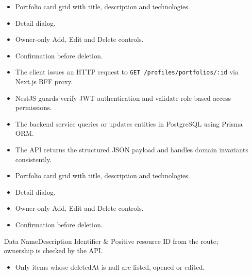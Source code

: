 \begin{itemize}[leftmargin=1.6em,topsep=3pt,itemsep=2pt,parsep=0pt,label=$\bullet$]
    \item Portfolio card grid with title, description and technologies.
    \item Detail dialog.
    \item Owner-only Add, Edit and Delete controls.
    \item Confirmation before deletion.
\end{itemize}

\begin{itemize}[leftmargin=1.6em,topsep=3pt,itemsep=2pt,parsep=0pt,label=$\bullet$]
    \item The client issues an HTTP request to \texttt{GET /\allowbreak{}profiles/\allowbreak{}portfolios/\allowbreak{}:\allowbreak{}id} via Next.js BFF proxy.
    \item NestJS guards verify JWT authentication and validate role-based access permissions.
    \item The backend service queries or updates entities in PostgreSQL using Prisma ORM.
    \item The API returns the structured JSON payload and handles domain invariants consistently.
\end{itemize}

\begin{itemize}[leftmargin=1.6em,topsep=3pt,itemsep=2pt,parsep=0pt,label=$\bullet$]
    \item Portfolio card grid with title, description and technologies.
    \item Detail dialog.
    \item Owner-only Add, Edit and Delete controls.
    \item Confirmation before deletion.
\end{itemize}


\begin{specdatatable}{Data Name}{Description}
Identifier & Positive resource ID from the route; ownership is checked by the API.\\ \hline
\end{specdatatable}

\begin{itemize}[leftmargin=1.6em,topsep=3pt,itemsep=2pt,parsep=0pt,label=$\bullet$]
    \item Only items whose deletedAt is null are listed, opened or edited.
\end{itemize}

